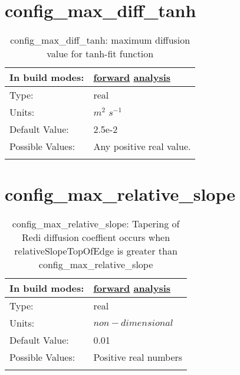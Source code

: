 \section[config\_max\_diff\_tanh]{config\_max\_diff\_tanh}
\label{sec:nm_sec_config_max_diff_tanh}
\begin{center}
\begin{longtable}{| p{2.0in} || p{4.0in} |}
    \hline
    In build modes: & \hyperref[subsec:forward_nm_tab_vmix_tanh]{forward} \hyperref[subsec:analysis_nm_tab_vmix_tanh]{analysis} \\
    \hline
    Type: & real \\
    \hline
    Units: & $m^2$ $s^{-1}$ \\
    \hline
    Default Value: & 2.5e-2 \\
    \hline
    Possible Values: & Any positive real value. \\
    \hline
    \caption{config\_max\_diff\_tanh: maximum diffusion value for tanh-fit function}
\end{longtable}
\end{center}
\section[config\_max\_relative\_slope]{config\_max\_relative\_slope}
\label{sec:nm_sec_config_max_relative_slope}
\begin{center}
\begin{longtable}{| p{2.0in} || p{4.0in} |}
    \hline
    In build modes: & \hyperref[subsec:forward_nm_tab_mesoscale_eddy_parameterization]{forward} \hyperref[subsec:analysis_nm_tab_mesoscale_eddy_parameterization]{analysis} \\
    \hline
    Type: & real \\
    \hline
    Units: & $non-dimensional$ \\
    \hline
    Default Value: & 0.01 \\
    \hline
    Possible Values: & Positive real numbers \\
    \hline
    \caption{config\_max\_relative\_slope: Tapering of Redi diffusion coeffient occurs when relativeSlopeTopOfEdge is greater than config\_max\_relative\_slope}
\end{longtable}
\end{center}
